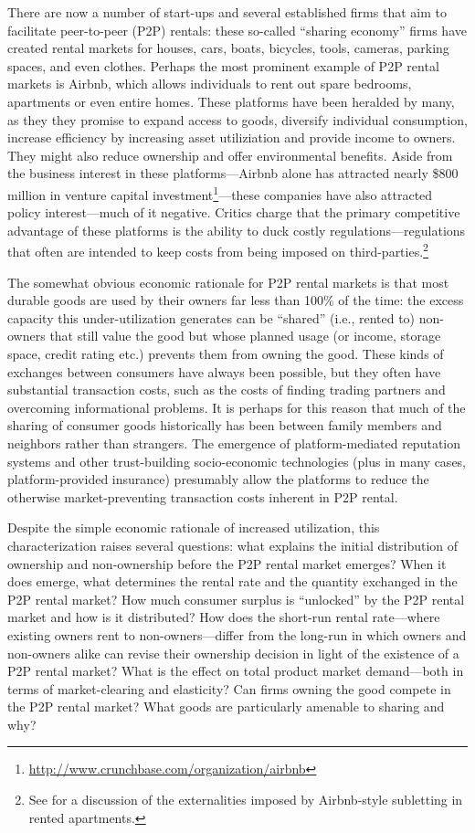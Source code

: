 \documentclass[11pt]{article}
\begin{document}
There are now a number of start-ups and several established firms that aim to facilitate peer-to-peer (P2P) rentals: 
these so-called ``sharing economy'' firms have created rental markets for houses, cars, boats, bicycles, tools, cameras, parking spaces, and even clothes. 
Perhaps the most prominent example of P2P rental markets is Airbnb, which allows individuals to rent out spare bedrooms, apartments or even entire homes. 
These platforms have been heralded by many, as they they promise to expand access to goods, diversify individual consumption, increase efficiency by increasing asset utiliziation and provide income to owners.
They might also reduce ownership and offer environmental benefits.  
Aside from the business interest in these platforms---Airbnb alone has attracted nearly \$800 million in venture capital investment\footnote{\href{http://www.crunchbase.com/organization/airbnb}{http://www.crunchbase.com/organization/airbnb}}---these companies have also attracted policy interest---much of it negative. 
Critics charge that the primary competitive advantage of these platforms is the ability to duck costly regulations---regulations that often are intended to keep costs from being imposed on third-parties.\footnote{See \cite{horton2014tragedy} for a discussion of the externalities imposed by Airbnb-style subletting in rented apartments.}   

The somewhat obvious economic rationale for P2P rental markets is that most durable goods are used by their owners far less than 100\% of the time: 
the excess capacity this under-utilization generates can be ``shared'' (i.e., rented to) non-owners that still value the good but whose planned usage (or income, storage space, credit rating etc.) prevents them from owning the good. 
These kinds of exchanges between consumers have always been possible, but they often have substantial transaction costs, such as the costs of finding trading partners and overcoming informational problems. 
It is perhaps for this reason that much of the sharing of consumer goods historically has been between family members and neighbors rather than strangers. 
The emergence of platform-mediated reputation systems and other trust-building socio-economic technologies (plus in many cases, platform-provided insurance) presumably allow the platforms to reduce the otherwise market-preventing transaction costs inherent in P2P rental. 

Despite the simple economic rationale of increased utilization, this characterization raises several questions:
what explains the initial distribution of ownership and non-ownership before the P2P rental market emerges?
When it does emerge, what determines the rental rate and the quantity exchanged in the P2P rental market? 
How much consumer surplus is ``unlocked'' by the P2P rental market and how is it distributed? 
How does the short-run rental rate---where existing owners rent to non-owners---differ from the long-run in which owners and non-owners alike can revise their ownership decision in light of the existence of a P2P rental market?  
What is the effect on total product market demand---both in terms of market-clearing and elasticity?  
Can firms owning the good compete in the P2P rental market? 
What goods are particularly amenable to sharing and why?
  
\end{document}
